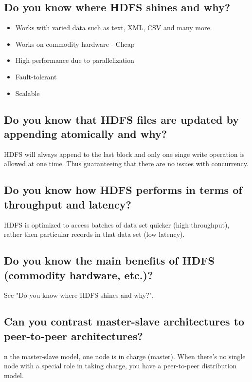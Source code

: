 \documentclass{article}
\begin{document}
\subsection{Do you know where HDFS shines and why?}

\begin{itemize}
    \item Works with varied data such as text, XML, CSV and many more. 
    \item Works on commodity hardware - Cheap
    \item High performance due to parallelization
    \item Fault-tolerant
    \item Scalable
\end{itemize}

\subsection{Do you know that HDFS files are updated by appending atomically and why?}

HDFS will always append to the last block and only one singe write operation is allowed at one time. Thus guaranteeing that there are no issues with concurrency.

\subsection{Do you know how HDFS performs in terms of throughput and latency?}

{\color{red} HDFS is optimized to access batches of data set quicker (high throughput), rather then particular records in that data set (low latency).}

\subsection{Do you know the main benefits of HDFS (commodity hardware, etc.)?}

See "Do you know where HDFS shines and why?".

\subsection{Can you contrast master-slave architectures to peer-to-peer architectures?}

n the master-slave model, one node is in charge (master). When there’s no single node with a special role in taking charge, you have a peer-to-peer distribution model.
\end{document}
